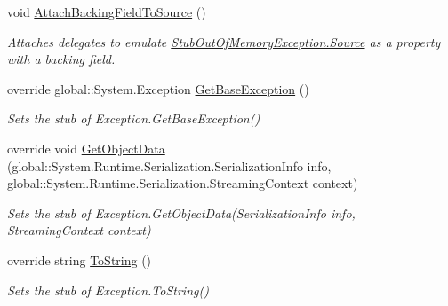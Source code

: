 \begin{DoxyCompactItemize}
void \hyperlink{class_system_1_1_fakes_1_1_stub_out_of_memory_exception_a35362a92511809a8ed654dc4c95c4a82}{Attach\-Backing\-Field\-To\-Source} ()
\begin{DoxyCompactList}\small\item\em Attaches delegates to emulate \hyperlink{class_system_1_1_fakes_1_1_stub_out_of_memory_exception_aabd5b9a856831adfda6f6e073ac7eff4}{Stub\-Out\-Of\-Memory\-Exception.\-Source} as a property with a backing field.\end{DoxyCompactList}\item 
override global\-::\-System.\-Exception \hyperlink{class_system_1_1_fakes_1_1_stub_out_of_memory_exception_a3514ada50c8769e7beefad2c0b039f67}{Get\-Base\-Exception} ()
\begin{DoxyCompactList}\small\item\em Sets the stub of Exception.\-Get\-Base\-Exception()\end{DoxyCompactList}\item 
override void \hyperlink{class_system_1_1_fakes_1_1_stub_out_of_memory_exception_ac102d45b7fe3965f7874ce06954abd5b}{Get\-Object\-Data} (global\-::\-System.\-Runtime.\-Serialization.\-Serialization\-Info info, global\-::\-System.\-Runtime.\-Serialization.\-Streaming\-Context context)
\begin{DoxyCompactList}\small\item\em Sets the stub of Exception.\-Get\-Object\-Data(\-Serialization\-Info info, Streaming\-Context context)\end{DoxyCompactList}\item 
override string \hyperlink{class_system_1_1_fakes_1_1_stub_out_of_memory_exception_a18dfe06c02bec4f0c15b6bc0ee294444}{To\-String} ()
\begin{DoxyCompactList}\small\item\em Sets the stub of Exception.\-To\-String()\end{DoxyCompactList}\end{DoxyCompactItemize}
